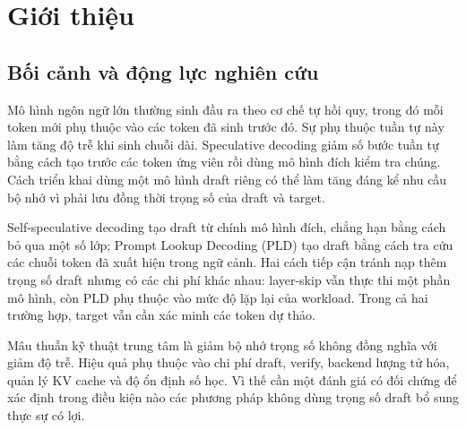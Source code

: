 \chapter{Giới thiệu}

\section{Bối cảnh và động lực nghiên cứu}
Mô hình ngôn ngữ lớn thường sinh đầu ra theo cơ chế tự hồi quy, trong đó mỗi token mới phụ thuộc vào các token đã sinh trước đó. Sự phụ thuộc tuần tự này làm tăng độ trễ khi sinh chuỗi dài. Speculative decoding giảm số bước tuần tự bằng cách tạo trước các token ứng viên rồi dùng mô hình đích kiểm tra chúng. Cách triển khai dùng một mô hình draft riêng có thể làm tăng đáng kể nhu cầu bộ nhớ vì phải lưu đồng thời trọng số của draft và target.

Self-speculative decoding tạo draft từ chính mô hình đích, chẳng hạn bằng cách bỏ qua một số lớp; Prompt Lookup Decoding (PLD) tạo draft bằng cách tra cứu các chuỗi token đã xuất hiện trong ngữ cảnh. Hai cách tiếp cận tránh nạp thêm trọng số draft nhưng có các chi phí khác nhau: layer-skip vẫn thực thi một phần mô hình, còn PLD phụ thuộc vào mức độ lặp lại của workload. Trong cả hai trường hợp, target vẫn cần xác minh các token dự thảo.

Mâu thuẫn kỹ thuật trung tâm là giảm bộ nhớ trọng số không đồng nghĩa với giảm độ trễ. Hiệu quả phụ thuộc vào chi phí draft, verify, backend lượng tử hóa, quản lý KV cache và độ ổn định số học. Vì thế cần một đánh giá có đối chứng để xác định trong điều kiện nào các phương pháp không dùng trọng số draft bổ sung thực sự có lợi.

